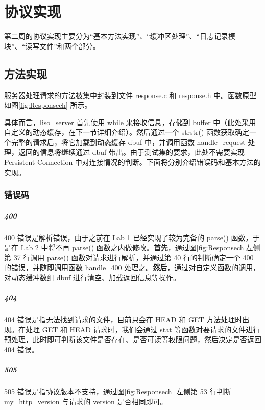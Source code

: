
\chapter{协议实现}

第二周的协议实现主要分为“基本方法实现”、“缓冲区处理”、“日志记录模块”、“读写文件”和两个部分。

\section{方法实现}

服务器处理请求的方法被集中封装到文件 response.c 和 response.h 中。函数原型如图\ref{fig:Responsech} 所示。

具体而言，liso\_server 首先使用 while 来接收信息，存储到 buffer 中（此处采用自定义的动态缓存，在下一节详细介绍）。然后通过一个 strstr() 函数获取确定一个完整的请求后，将它加载到动态缓存 dbuf 中，并调用函数 handle\_request 处理，返回的信息将继续通过 dbuf 带出。由于测试集的要求，此处不需要实现 Persistent Connection 中对连接情况的判断。下面将分别介绍错误码和基本方法的实现。

\subsection{错误码}

\paragraph*{400}
400 错误是解析错误，由于之前在 Lab 1 已经实现了较为完备的 parse() 函数，于是在 Lab 2 中将不再 parse() 函数之内做修改。\textbf{首先}，通过图\ref{fig:Responsech}左侧 第 37 行调用 parse() 函数对请求进行解析，并通过第 40 行的判断确定一个 400 的错误，并随即调用函数 handle\_400 处理之。\textbf{然后}，通过对自定义函数的调用，对动态缓冲数组 dbuf 进行清空、加载返回信息等操作。

\paragraph*{404}
404 错误是指无法找到请求的文件，目前只会在 HEAD 和 GET 方法处理时出现。在处理 GET 和 HEAD 请求时，我们会通过 stat 等函数对要请求的文件进行预处理，此时即可判断该文件是否存在、是否可读等权限问题，然后决定是否返回 404 错误。

\paragraph*{505}
505 错误是指协议版本不支持，通过图\ref{fig:Responsech} 左侧第 53 行判断 my\_http\_version 与请求的 version 是否相同即可。

